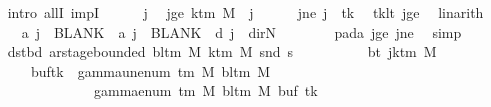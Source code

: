 \begin{isabellebody}
\ \ \isamarkupfalse%
\ {\isacharparenleft}{\kern0pt}intro\ allI\ impI{\isacharparenright}{\kern0pt}\isanewline
\ \ \ \ \isamarkupfalse%
\ j\ \isamarkupfalse%
\ jge{\isacharcolon}{\kern0pt}\ {\isachardoublequoteopen}k{\isacharunderscore}{\kern0pt}tm\ M\ {\isasymle}\ j{\isachardoublequoteclose}\isanewline
\ \ \ \ \isamarkupfalse%
\ jne{\isacharcolon}{\kern0pt}\ {\isachardoublequoteopen}j\ {\isasymnoteq}\ tk{\isachardoublequoteclose}\ \isamarkupfalse%
\ tk{\isacharunderscore}{\kern0pt}lt\ jge\ \isamarkupfalse%
\ linarith\isanewline
\ \ \ \ \isamarkupfalse%
\ {\isachardoublequoteopen}{\isacharquery}{\kern0pt}a\ j\ {\isacharequal}{\kern0pt}\ BLANK{}\ {\isasymand}\ {\isacharquery}{\kern0pt}a\ j\ {\isacharequal}{\kern0pt}\ BLANK{}\ {\isasymand}\ {\isacharquery}{\kern0pt}d\ j\ {\isacharequal}{\kern0pt}\ dir{\isachardot}{\kern0pt}N{\isachardoublequoteclose}\isanewline
\ \ \ \ \ \ \isamarkupfalse%
\ pad{\isacharunderscore}{\kern0pt}a\ jge\ jne\ \isamarkupfalse%
\ simp\isanewline
\ \ \isamarkupfalse%
\isanewline
\ \ \isamarkupfalse%
\ dst{\isacharunderscore}{\kern0pt}bd{\isacharcolon}{\kern0pt}\ {\isachardoublequoteopen}ar{\isacharunderscore}{\kern0pt}stage{\isacharunderscore}{\kern0pt}bounded\ {\isacharparenleft}{\kern0pt}bl{\isacharunderscore}{\kern0pt}tm\ M{\isacharparenright}{\kern0pt}\ {\isacharparenleft}{\kern0pt}k{\isacharunderscore}{\kern0pt}tm\ M{\isacharparenright}{\kern0pt}\ {\isacharparenleft}{\kern0pt}snd\ {\isacharquery}{\kern0pt}s{\isacharprime}{\kern0pt}{\isacharparenright}{\kern0pt}{\isachardoublequoteclose}\isanewline
\ \ \isamarkupfalse%
\ {\isacharminus}{\kern0pt}\isanewline
\ \ \ \ \isamarkupfalse%
\ bt{\isacharcolon}{\kern0pt}\ {\isachardoublequoteopen}{\isasymforall}j{\isasymge}k{\isacharunderscore}{\kern0pt}tm\ M{\isachardot}{\kern0pt}\isanewline
\ \ \ \ \ \ \ {\isacharparenleft}{\kern0pt}buf{\isacharparenleft}{\kern0pt}tk\ {\isacharcolon}{\kern0pt}{\isacharequal}{\kern0pt}\ gamma{\isacharunderscore}{\kern0pt}unenum\ {\isacharparenleft}{\kern0pt}{\isasymGamma}{\isacharunderscore}{\kern0pt}tm\ M{\isacharparenright}{\kern0pt}\ {\isacharparenleft}{\kern0pt}bl{\isacharunderscore}{\kern0pt}tm\ M{\isacharparenright}{\kern0pt}\isanewline
\ \ \ \ \ \ \ \ \ \ \ \ \ \ {\isacharparenleft}{\kern0pt}{}\ {\isacharasterisk}{\kern0pt}\ gamma{\isacharunderscore}{\kern0pt}enum\ {\isacharparenleft}{\kern0pt}{\isasymGamma}{\isacharunderscore}{\kern0pt}tm\ M{\isacharparenright}{\kern0pt}\ {\isacharparenleft}{\kern0pt}bl{\isacharunderscore}{\kern0pt}tm\ M{\isacharparenright}{\kern0pt}\ {\isacharparenleft}{\kern0pt}buf\ tk{\isacharparenright}{\kern0pt}\isanewline

\end{isabellebody}
